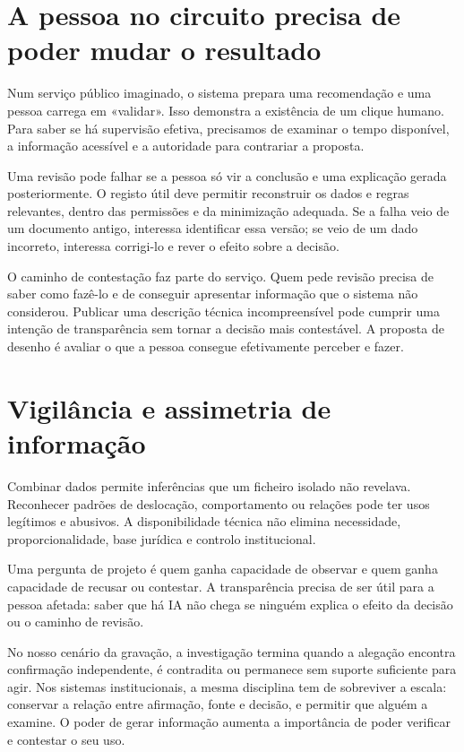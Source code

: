 \section{A pessoa no circuito precisa de poder mudar o resultado}
Num serviço público imaginado, o sistema prepara uma recomendação e uma pessoa carrega em «validar». Isso demonstra a existência de um clique humano. Para saber se há supervisão efetiva, precisamos de examinar o tempo disponível, a informação acessível e a autoridade para contrariar a proposta.

Uma revisão pode falhar se a pessoa só vir a conclusão e uma explicação gerada posteriormente. O registo útil deve permitir reconstruir os dados e regras relevantes, dentro das permissões e da minimização adequada. Se a falha veio de um documento antigo, interessa identificar essa versão; se veio de um dado incorreto, interessa corrigi-lo e rever o efeito sobre a decisão.

O caminho de contestação faz parte do serviço. Quem pede revisão precisa de saber como fazê-lo e de conseguir apresentar informação que o sistema não considerou. Publicar uma descrição técnica incompreensível pode cumprir uma intenção de transparência sem tornar a decisão mais contestável. A proposta de desenho é avaliar o que a pessoa consegue efetivamente perceber e fazer.

\section{Vigilância e assimetria de informação}
Combinar dados permite inferências que um ficheiro isolado não revelava. Reconhecer padrões de deslocação, comportamento ou relações pode ter usos legítimos e abusivos. A disponibilidade técnica não elimina necessidade, proporcionalidade, base jurídica e controlo institucional.

Uma pergunta de projeto é quem ganha capacidade de observar e quem ganha capacidade de recusar ou contestar. A transparência precisa de ser útil para a pessoa afetada: saber que há IA não chega se ninguém explica o efeito da decisão ou o caminho de revisão.

No nosso cenário da gravação, a investigação termina quando a alegação encontra confirmação independente, é contradita ou permanece sem suporte suficiente para agir. Nos sistemas institucionais, a mesma disciplina tem de sobreviver a escala: conservar a relação entre afirmação, fonte e decisão, e permitir que alguém a examine. O poder de gerar informação aumenta a importância de poder verificar e contestar o seu uso.

